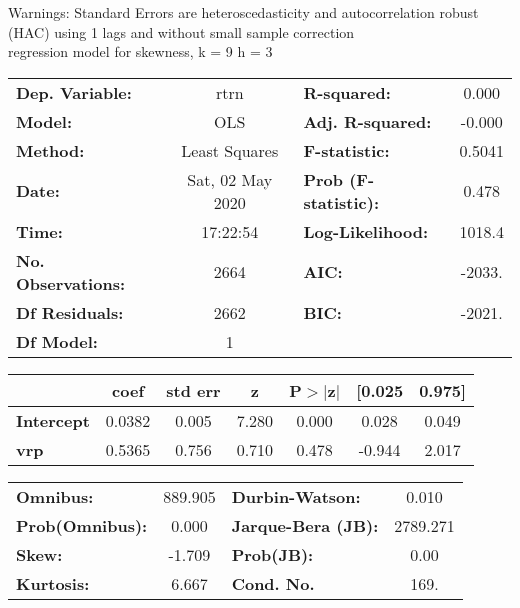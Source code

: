 Warnings: \newline
 [1] Standard Errors are heteroscedasticity and autocorrelation robust (HAC) using 1 lags and without small sample correction\\ 

regression model for skewness, k = 9 h = 3\begin{center}
\begin{tabular}{lclc}
\toprule
\textbf{Dep. Variable:}    &       rtrn       & \textbf{  R-squared:         } &     0.000   \\
\textbf{Model:}            &       OLS        & \textbf{  Adj. R-squared:    } &    -0.000   \\
\textbf{Method:}           &  Least Squares   & \textbf{  F-statistic:       } &    0.5041   \\
\textbf{Date:}             & Sat, 02 May 2020 & \textbf{  Prob (F-statistic):} &    0.478    \\
\textbf{Time:}             &     17:22:54     & \textbf{  Log-Likelihood:    } &    1018.4   \\
\textbf{No. Observations:} &        2664      & \textbf{  AIC:               } &    -2033.   \\
\textbf{Df Residuals:}     &        2662      & \textbf{  BIC:               } &    -2021.   \\
\textbf{Df Model:}         &           1      & \textbf{                     } &             \\
\bottomrule
\end{tabular}
\begin{tabular}{lcccccc}
                   & \textbf{coef} & \textbf{std err} & \textbf{z} & \textbf{P$> |$z$|$} & \textbf{[0.025} & \textbf{0.975]}  \\
\midrule
\textbf{Intercept} &       0.0382  &        0.005     &     7.280  &         0.000        &        0.028    &        0.049     \\
\textbf{vrp}       &       0.5365  &        0.756     &     0.710  &         0.478        &       -0.944    &        2.017     \\
\bottomrule
\end{tabular}
\begin{tabular}{lclc}
\textbf{Omnibus:}       & 889.905 & \textbf{  Durbin-Watson:     } &    0.010  \\
\textbf{Prob(Omnibus):} &   0.000 & \textbf{  Jarque-Bera (JB):  } & 2789.271  \\
\textbf{Skew:}          &  -1.709 & \textbf{  Prob(JB):          } &     0.00  \\
\textbf{Kurtosis:}      &   6.667 & \textbf{  Cond. No.          } &     169.  \\
\bottomrule
\end{tabular}
\end{center}

